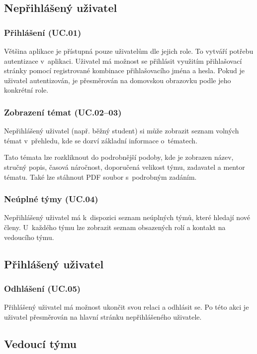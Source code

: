 \documentclass[czech,BP]{thesiskiv}
\begin{document}
		\subsection{Nepřihlášený uživatel}
			\subsubsection{Přihlášení (UC.01)}
				\par Většina aplikace je přístupná pouze uživatelům dle jejich role. To vytváří potřebu autentizace v~aplikaci. Uživatel má možnost se přihlásit využitím přihlašovací stránky pomocí registrované kombinace přihlašovacího jména a hesla. Pokud je uživatel autentizován, je přesměrován na domovskou obrazovku podle jeho konkrétní role.
			\subsubsection{Zobrazení témat (UC.02--03)}
				\par Nepřihlášený uživatel (např. běžný student) si může zobrazit seznam volných témat v~přehledu, kde se dozví základní informace o~tématech.
				\par Tato témata lze rozkliknout do podrobnější podoby, kde je zobrazen název, stručný popis, časová náročnost, doporučená velikost týmu, zadavatel a mentor tématu. Také lze stáhnout PDF soubor s~podrobným zadáním.
			\subsubsection{Neúplné týmy (UC.04)}
				\par Nepřihlášený uživatel má k~dispozici seznam neúplných týmů, které hledají nové členy. U~každého týmu lze zobrazit seznam obsazených rolí a kontakt na vedoucího týmu.
		\subsection{Přihlášený uživatel}
			\subsubsection{Odhlášení (UC.05)}
				\par Přihlášený uživatel má možnost ukončit svou relaci a odhlásit se. Po této akci je uživatel přesměrován na hlavní stránku nepřihlášeného uživatele.
		\subsection{Vedoucí týmu}
\end{document}
